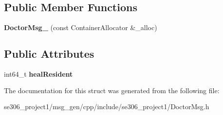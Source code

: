 \subsection*{Public Member Functions}
\begin{DoxyCompactItemize}
\item 
\hypertarget{structse306__project1_1_1DoctorMsg___a011e25faaa89c7cc8a34e8ef14c9e486}{{\bfseries Doctor\-Msg\-\_\-} (const Container\-Allocator \&\-\_\-alloc)}\label{structse306__project1_1_1DoctorMsg___a011e25faaa89c7cc8a34e8ef14c9e486}

\end{DoxyCompactItemize}
\subsection*{Public Attributes}
\begin{DoxyCompactItemize}
\item 
\hypertarget{structse306__project1_1_1DoctorMsg___a210c5feafa80fe2a63831916ad133974}{int64\-\_\-t {\bfseries heal\-Resident}}\label{structse306__project1_1_1DoctorMsg___a210c5feafa80fe2a63831916ad133974}

\end{DoxyCompactItemize}


The documentation for this struct was generated from the following file\-:\begin{DoxyCompactItemize}
\item 
se306\-\_\-project1/msg\-\_\-gen/cpp/include/se306\-\_\-project1/Doctor\-Msg.\-h\end{DoxyCompactItemize}
